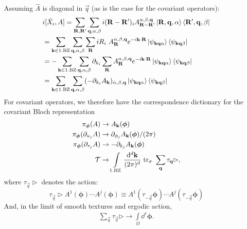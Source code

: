 \documentclass[
    10pt,
    aps,
    prb,
	longbibliography,
    twocolumn,
    floatfix,
    superscriptaddress,
]{revtex4-2}
\begin{document}
Assuming $\hat{A}$ is diagonal in $\vec{q}$ (as is the case for the covariant operators):
\begin{align}
	&i [ \hat{X}_i, A]
	 =  \sum_{\mathbf{R}, \mathbf{R}'} \sum_{\mathbf{q} , \alpha, \beta}
	i(\mathbf{R}-\mathbf{R}')_i A_{\mathbf{R}-\mathbf{R}'}^{ \alpha, \beta, \mathbf{q}} \ket{\mathbf{R}, \mathbf{q}, \alpha} \bra{\mathbf{R}',\mathbf{q}, \beta}
	\notag \\
	& =    \sum_{\mathbf{k} \in \mathrm{1. BZ}} \sum_{\mathbf{q} , \alpha, \beta}
	\sum_{\mathbf{R}}   i R_i~ A_{\mathbf{R}}^{ \alpha, \beta, \mathbf{q}} 
	e^{-i \mathbf{k}\cdot\mathbf{R}} 
	\ket{\psi_{\mathbf{k} \mathbf{q} \alpha}} \bra{\psi_{\mathbf{k} \mathbf{q} \beta}}
	\notag \\
	& =   -\sum_{\mathbf{k} \in \mathrm{1. BZ}} \sum_{\mathbf{q} , \alpha, \beta}\partial_{k_i}
	\sum_{\mathbf{R}}   A_{\mathbf{R}}^{ \alpha, \beta, \mathbf{q}} 
	e^{-i \mathbf{k}\cdot\mathbf{R}} 
	\ket{\psi_{\mathbf{k} \mathbf{q} \alpha}} \bra{\psi_{\mathbf{k} \mathbf{q} \beta}}
	\notag \\
	& =   \sum_{\mathbf{k} \in \mathrm{1. BZ}}\sum_{\mathbf{q} , \alpha, \beta}
	(-\partial_{k_i}A_{\mathbf{k}})_{ \alpha, \beta, \mathbf{q}}
	\ket{\psi_{\mathbf{k} \mathbf{q} \alpha}} \bra{\psi_{\mathbf{k} \mathbf{q} \beta}} 
\end{align}
For covariant operators, we therefore have the correspondence dictionary for the covariant Bloch representation
\begin{align}
	\pi_{\boldsymbol{\phi}}(A)
	& \to A_{\mathbf{k}}(\boldsymbol{\phi})
	\label{eq:rep1}
\\
	\pi_{\boldsymbol{\phi}}(\partial_{u_j} A)
	& 
	\to \partial_{\phi_j} A_{\mathbf{k}}(\boldsymbol{\phi}) / (2\pi)
	\label{eq:rep2}
	\\
	\pi_{\boldsymbol{\phi}}(\partial_{\tau_j} A)
	& 
	\to -\partial_{k_j} A_{\mathbf{k}}(\boldsymbol{\phi}) 
	\label{eq:rep3}
\\
 \mathcal{T} & \to  \int\limits_{\mathrm{1.BZ}} \frac{\mathrm{d}^d \mathbf{k}}{(2\pi)^d}~ \mathrm{tr}_\sigma ~ \sum_{\mathbf{q}}\tau_{\mathbf{q}} \rhd,
\end{align}
where $\tau_{\vec{q}} \rhd$ denotes the action: 
\begin{equation}
	\tau_{\vec{q}} \rhd A^1( \boldsymbol{\phi}) \cdots  A^j( \boldsymbol{\phi}) \equiv A^1( \tau_{-\vec{q}}\boldsymbol{\phi}) \cdots  A^j( \tau_{-\vec{q}}\boldsymbol{\phi})
\end{equation}
And, in the limit of smooth textures and ergodic action,
\begin{align}
	\sum_{\vec{q}}\tau_{\vec{q}} \rhd \to \int\limits_{\Omega }\dd^r \boldsymbol{\phi} .
\end{align}
\end{document}
